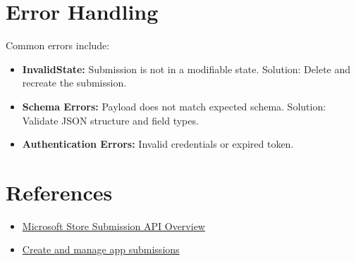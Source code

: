 \documentclass{article}
\begin{document}
\section{Error Handling}
Common errors include:
\begin{itemize}
    \item \textbf{InvalidState:} Submission is not in a modifiable state. Solution: Delete and recreate the submission.
    \item \textbf{Schema Errors:} Payload does not match expected schema. Solution: Validate JSON structure and field types.
    \item \textbf{Authentication Errors:} Invalid credentials or expired token.
\end{itemize}

\section{References}
\begin{itemize}
    \item \href{https://learn.microsoft.com/en-us/windows/uwp/publish/app-submission-api-overview}{Microsoft Store Submission API Overview}
    \item \href{https://learn.microsoft.com/en-us/windows/uwp/publish/create-app-submission}{Create and manage app submissions}
\end{itemize}
\end{document}
